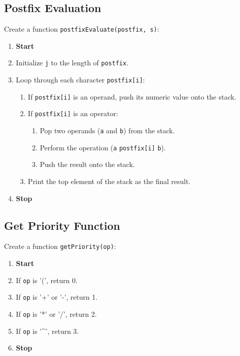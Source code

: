 {  \subsection{Postfix Evaluation}
  Create a function \texttt{postfixEvaluate(postfix, s)}:
  \begin{enumerate}[label=\arabic*:,left=0pt]
    \item \textbf{Start}
    \item Initialize \texttt{j} to the length of \texttt{postfix}.
    \item Loop through each character \texttt{postfix[i]}:
          \begin{enumerate}[label=2.\arabic*.]
            \item If \texttt{postfix[i]} is an operand, push its numeric value onto the stack.
            \item If \texttt{postfix[i]} is an operator:
                  \begin{enumerate}[label=2.2.\arabic*.]
                    \item Pop two operands (\texttt{a} and \texttt{b}) from the stack.
                    \item Perform the operation (\texttt{a} \texttt{postfix[i]} \texttt{b}).
                    \item Push the result onto the stack.
                  \end{enumerate}
            \item Print the top element of the stack as the final result.
          \end{enumerate}
    \item \textbf{Stop}
  \end{enumerate}

  \subsection{Get Priority Function}
  Create a function \texttt{getPriority(op)}:
  \begin{enumerate}[label=\arabic*:,left=0pt]
    \item \textbf{Start}
    \item If \texttt{op} is '(', return 0.
    \item If \texttt{op} is '+' or '-', return 1.
    \item If \texttt{op} is '*' or '/', return 2.
    \item If \texttt{op} is '\textasciicircum', return 3.
    \item \textbf{Stop}
  \end{enumerate}

}
